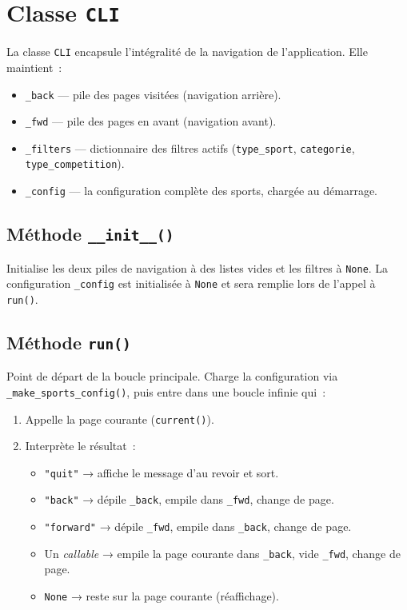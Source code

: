 \documentclass[12pt,a4paper]{article}
\begin{document}
\section{Classe \texttt{CLI}}

La classe \texttt{CLI} encapsule l'intégralité de la navigation de
l'application. Elle maintient~:
\begin{itemize}
    \item \texttt{\_back} — pile des pages visitées (navigation arrière).
    \item \texttt{\_fwd} — pile des pages en avant (navigation avant).
    \item \texttt{\_filters} — dictionnaire des filtres actifs
    (\texttt{type\_sport}, \texttt{categorie}, \texttt{type\_competition}).
    \item \texttt{\_config} — la configuration complète des sports,
    chargée au démarrage.
\end{itemize}

\subsection{Méthode \texttt{\_\_init\_\_()}}
Initialise les deux piles de navigation à des listes vides et les
filtres à \texttt{None}. La configuration \texttt{\_config} est
initialisée à \texttt{None} et sera remplie lors de l'appel à
\texttt{run()}.

\subsection{Méthode \texttt{run()}}
Point de départ de la boucle principale. Charge la configuration via
\texttt{\_make\_sports\_config()}, puis entre dans une boucle infinie
qui~:
\begin{enumerate}
    \item Appelle la page courante (\texttt{current()}).
    \item Interprète le résultat~:
    \begin{itemize}
        \item \texttt{"quit"} → affiche le message d'au revoir et sort.
        \item \texttt{"back"} → dépile \texttt{\_back}, empile dans
        \texttt{\_fwd}, change de page.
        \item \texttt{"forward"} → dépile \texttt{\_fwd}, empile dans
        \texttt{\_back}, change de page.
        \item Un \textit{callable} → empile la page courante dans
        \texttt{\_back}, vide \texttt{\_fwd}, change de page.
        \item \texttt{None} → reste sur la page courante (réaffichage).
    \end{itemize}
\end{enumerate}
\end{document}
